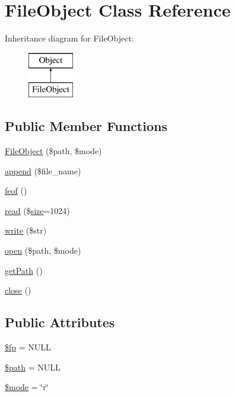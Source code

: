 \hypertarget{classFileObject}{}\section{File\+Object Class Reference}
\label{classFileObject}
Inheritance diagram for File\+Object\+:\begin{figure}[H]
\begin{center}
\leavevmode
\includegraphics[height=2.000000cm]{classFileObject}
\end{center}
\end{figure}
\subsection*{Public Member Functions}
\begin{DoxyCompactItemize}
\item 
\hyperlink{classFileObject_ab910aa1514ad470442e6b1adc236bb8f}{File\+Object} (\$path, \$mode)
\item 
\hyperlink{classFileObject_add062e05a5efc8c4c5947cbf3ff120a7}{append} (\$file\+\_\+name)
\item 
\hyperlink{classFileObject_a83ecf26332ee98598e0d45cae59b8e63}{feof} ()
\item 
\hyperlink{classFileObject_af345fcd2d619a3e13b1f95f744964617}{read} (\$\hyperlink{jquery-1_8x_8js_afa6806c6ee5e63d5177f1dcc082ba6bc}{size}=1024)
\item 
\hyperlink{classFileObject_a6bfe97d0df5b57183c0816fb013b7fb2}{write} (\$str)
\item 
\hyperlink{classFileObject_af54e058c79d19dca6ef4c6e2bb54831f}{open} (\$path, \$mode)
\item 
\hyperlink{classFileObject_a3c8f4eff2c65c91f6ae36bb57ab332c5}{get\+Path} ()
\item 
\hyperlink{classFileObject_a14dcc624814271fb3f91a2a20a23ab24}{close} ()
\end{DoxyCompactItemize}
\subsection*{Public Attributes}
\begin{DoxyCompactItemize}
\item 
\hyperlink{classFileObject_a3b4c55272cc7ab0a4e7e79aec6ebfbac}{\$fp} = N\+U\+LL
\item 
\hyperlink{classFileObject_aeaea5fd423f0c1349ad151f7da63f0e8}{\$path} = N\+U\+LL
\item 
\hyperlink{classFileObject_aa4cff8a1b117de6986c0765ae2284dab}{\$mode} = \char`\"{}r\char`\"{}
\end{DoxyCompactItemize}


